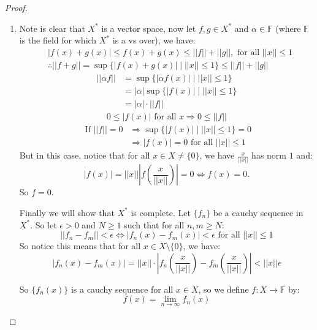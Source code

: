 \documentclass{article}
\theoremstyle{definition}
\theoremstyle{remark}
\theoremstyle{definition}
\begin{document}
\begin{proof}
   \begin{enumerate}[label = (\alph*)]
       \item Note is clear that $X^\ast$ is a vector space, now let $f,g\in X^\ast$ and $\alpha\in \mathbb{F}$ (where $\mathbb{F}$ is the field for which $X^\ast$ is a vs over), we have:\begin{align*}
        &|f(x)+g(x)|\leq f(x)+g(x) \leq ||f||+||g||, \text{ for all }||x||\leq 1\\
        &\therefore ||f+g|| = \sup\{|f(x)+g(x)| \mid ||x||\leq 1 \} \leq ||f||+||g||
    \end{align*}
    \begin{align*}
        ||\alpha f|| &= \sup\{|\alpha f(x)| \mid ||x||\leq 1 \}\\
        &= |\alpha|\sup\{|f(x)| \mid ||x||\leq 1 \}\\
        &= |\alpha|\cdot||f||
    \end{align*}
    \begin{align*}
        0\leq |f(x)| \text{ for all }x\Rightarrow 0\leq ||f||
    \end{align*}
    \begin{align*}
        \text{ If }||f|| = 0 &\Rightarrow \sup\{|f(x)| \mid ||x||\leq 1 \} = 0\\
        &\Rightarrow |f(x)| = 0\text{ for all }||x||\leq 1
    \end{align*}
    But in this case, notice that for all $x\in X\neq\{0\}$, we have $\frac{x}{||x||}$ has norm $1$ and:\begin{equation*}
        |f(x)| = ||x|||f(\frac{x}{||x||})| = 0 \iff f(x) = 0.
    \end{equation*}
    So $f = 0$.

    Finally we will show that $X^\ast$ is complete. Let $\{f_n\}$ be a cauchy sequence in $X^\ast$. So let $\epsilon>0$ and $N\geq 1$ such that for all $n,m\geq N$:
    \begin{equation}
        ||f_n-f_m|| < \epsilon \iff |f_n(x)-f_m(x)|<\epsilon \text{ for all }||x||\leq 1
    \end{equation}
    So notice this means that for all $x\in X\setminus\{0\}$, we have:\begin{equation}
        |f_n(x)-f_m(x)| = ||x||\cdot |f_n(\frac{x}{||x||})-f_m(\frac{x}{||x||})| < ||x||\epsilon
    \end{equation}

    So $\{f_n(x)\}$ is a cauchy sequence for all $x\in X$, so we define $f\colon X\rightarrow \mathbb{F}$ by:\begin{equation}
        f(x) = \lim_{n\rightarrow \infty}f_n(x)
    \end{equation}


\end{enumerate}
\end{proof}
\end{document}
